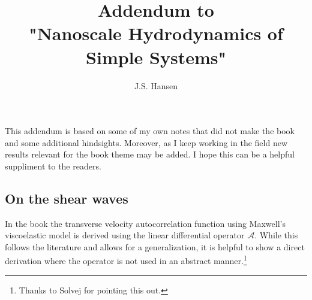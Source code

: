 \documentclass[11pt]{article}
\date{}
\author{J.S. Hansen}
\title{Addendum to \\ "Nanoscale Hydrodynamics of Simple Systems"}
\begin{document}
\maketitle

\noindent This addendum is based on some of my own notes that did not make the book and some 
additional hindsights. 
Moreover, as I keep working in the field new results relevant for the book theme may be added. I hope this can be a helpful suppliment to the readers.



\subsection*{On the shear waves}
In the book the transverse velocity autocorrelation function using Maxwell's viscoelastic model is 
derived using the linear differential operator $\mathcal{A}$. While this follows the literature and
allows for a generalization, it is helpful to show a direct derivation where 
the operator is not used in an abstract manner.\footnote{Thanks to Solvej for pointing this out.}  
\end{document}
